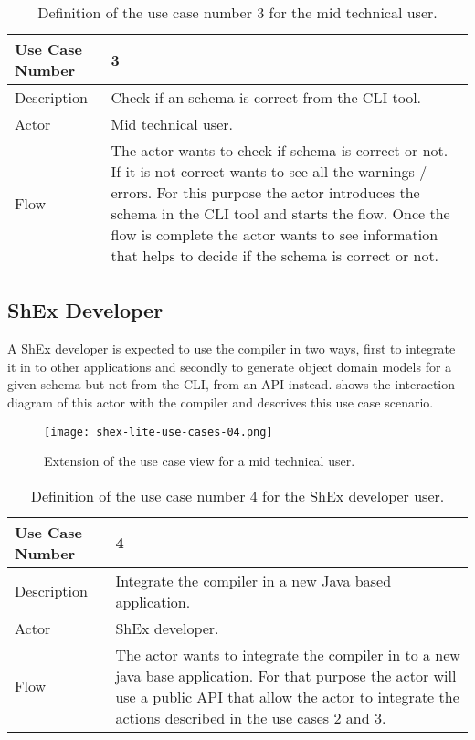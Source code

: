 \begin{table}
    \begin{tabular}{ | m{2cm} | m{8cm}| }
        \toprule
        Use Case Number & 3 \\
        \midrule
        Description & Check if an schema is correct from the CLI tool. \\
        \midrule
        Actor & Mid technical user. \\
        \midrule
        Flow & The actor wants to check if schema is correct or not. If it is not correct wants to see all the warnings / errors. For this purpose the actor introduces the schema in the CLI tool and starts the flow. Once the flow is complete the actor wants to see information that helps to decide if the schema is correct or not. \\
        \bottomrule
    \end{tabular}
    \caption[Definition of the use case number 3 for the mid technical user]{Definition of the use case number 3 for the mid technical user.}
\end{table}

\subsection{ShEx Developer}
A ShEx developer is expected to use the compiler in two ways, first to integrate it in to other applications and secondly to generate object domain models for a given schema but not from the CLI, from an API instead.  shows the interaction diagram of this actor with the compiler and  descrives this use case scenario.

\begin{figure}[hb]
    \texttt{[image: shex-lite-use-cases-04.png]}
    \caption[Extension of the use case view for a mid technical user]{Extension of the use case view for a mid technical user.}
\end{figure}

\begin{table}
    \begin{tabular}{ | m{2cm} | m{8cm}| }
        \toprule
        Use Case Number & 4 \\
        \midrule
        Description & Integrate the compiler in a new Java based application. \\
        \midrule
        Actor & ShEx developer. \\
        \midrule
        Flow & The actor wants to integrate the compiler in to a new java base application. For that purpose the actor will use a public API that allow the actor to integrate the actions described in the use cases 2 and 3. \\
        \bottomrule
    \end{tabular}
    \caption[Definition of the use case number 4 for the ShEx developer user]{Definition of the use case number 4 for the ShEx developer user.}
\end{table}

